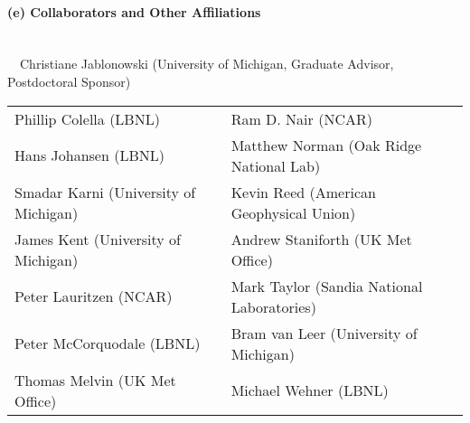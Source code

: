 \documentclass[11pt]{article}
\begin{document}
\vspace{-0.5cm}
\paragraph{\large (e) Collaborators and Other Affiliations}\ \\

\ \ Christiane Jablonowski (University of Michigan, Graduate Advisor, Postdoctoral Sponsor)

\noindent
\begin{tabular}{p{3.25in}p{3.25in}}
Phillip Colella (LBNL) & Ram D. Nair (NCAR) \\
Hans Johansen (LBNL) & Matthew Norman (Oak Ridge National Lab) \\
Smadar Karni (University of Michigan) & Kevin Reed (American Geophysical Union) \\
James Kent (University of Michigan) & Andrew Staniforth (UK Met Office) \\
Peter Lauritzen (NCAR) & Mark Taylor (Sandia National Laboratories) \\
Peter McCorquodale (LBNL) & Bram van Leer (University of Michigan) \\
Thomas Melvin (UK Met Office) & Michael Wehner (LBNL) \\
\end{tabular}
\end{document}
